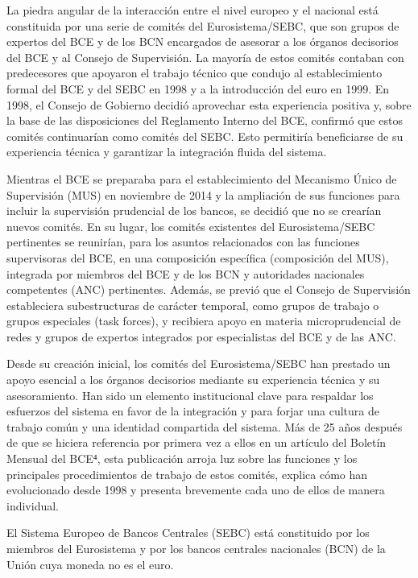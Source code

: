\documentclass[10pt,a4paper]{article}
\begin{document}
{La piedra angular de la interacción entre el nivel europeo y el nacional está constituida por una serie de comités del Eurosistema/SEBC, que son grupos de expertos del BCE y de los BCN encargados de asesorar a los órganos decisorios del BCE y al Consejo de Supervisión. La mayoría de estos comités contaban con predecesores que apoyaron el trabajo técnico que condujo al establecimiento formal del BCE y del SEBC en 1998 y a la introducción del euro en 1999. En 1998, el Consejo de Gobierno decidió aprovechar esta experiencia positiva y, sobre la base de las disposiciones del Reglamento Interno del BCE, confirmó que estos comités continuarían como comités del SEBC. Esto permitiría beneficiarse de su experiencia técnica y garantizar la integración fluida del sistema.

Mientras el BCE se preparaba para el establecimiento del Mecanismo Único de Supervisión (MUS) en noviembre de 2014 y la ampliación de sus funciones para incluir la supervisión prudencial de los bancos, se decidió que no se crearían nuevos comités. En su lugar, los comités existentes del Eurosistema/SEBC pertinentes se reunirían, para los asuntos relacionados con las funciones supervisoras del BCE, en una composición específica (composición del MUS), integrada por miembros del BCE y de los BCN y autoridades nacionales competentes (ANC) pertinentes. Además, se previó que el Consejo de Supervisión estableciera subestructuras de carácter temporal, como grupos de trabajo o grupos especiales (task forces), y recibiera apoyo en materia microprudencial de redes y grupos de expertos integrados por especialistas del BCE y de las ANC.

Desde su creación inicial, los comités del Eurosistema/SEBC han prestado un apoyo esencial a los órganos decisorios mediante su experiencia técnica y su asesoramiento. Han sido un elemento institucional clave para respaldar los esfuerzos del sistema en favor de la integración y para forjar una cultura de trabajo común y una identidad compartida del sistema. Más de 25 años después de que se hiciera referencia por primera vez a ellos en un artículo del Boletín Mensual del BCE⁴, esta publicación arroja luz sobre las funciones y los principales procedimientos de trabajo de estos comités, explica cómo han evolucionado desde 1998 y presenta brevemente cada uno de ellos de manera individual.

El Sistema Europeo de Bancos Centrales (SEBC) está constituido por los miembros del Eurosistema y por los bancos centrales nacionales (BCN) de la Unión cuya moneda no es el euro.

}
\end{document}
